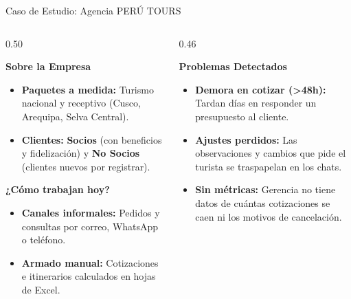 \documentclass[aspectratio=169, 10pt]{beamer}
\begin{document}
\begin{frame}{Caso de Estudio: Agencia PERÚ TOURS}
    \begin{columns}[t]
        \begin{column}{0.50\textwidth}
            \begin{block}{\textbf{Sobre la Empresa}}
                \small
                \begin{itemize}
                    \item \textbf{Paquetes a medida:} Turismo nacional y receptivo (Cusco, Arequipa, Selva Central).
                    \item \textbf{Clientes:} \textbf{Socios} (con beneficios y fidelización) y \textbf{No Socios} (clientes nuevos por registrar).
                \end{itemize}
            \end{block}

            \begin{block}{\textbf{¿Cómo trabajan hoy?}}
                \small
                \begin{itemize}
                    \item \textbf{Canales informales:} Pedidos y consultas por correo, WhatsApp o teléfono.
                    \item \textbf{Armado manual:} Cotizaciones e itinerarios calculados en hojas de Excel.
                \end{itemize}
            \end{block}
        \end{column}
        
        \begin{column}{0.46\textwidth}
            \begin{alertblock}{\textbf{Problemas Detectados}}
                \small
                \begin{itemize}
                    \item \textbf{Demora en cotizar (>48h):} Tardan días en responder un presupuesto al cliente.
                    \item \textbf{Ajustes perdidos:} Las observaciones y cambios que pide el turista se traspapelan en los chats.
                    \item \textbf{Sin métricas:} Gerencia no tiene datos de cuántas cotizaciones se caen ni los motivos de cancelación.
                \end{itemize}
            \end{alertblock}
        \end{column}
    \end{columns}
\end{frame}
\end{document}
